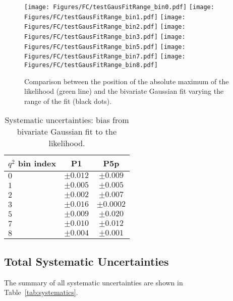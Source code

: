 \begin{figure}
  \centering
  \texttt{[image: Figures/FC/testGausFitRange\_bin0.pdf]}
  \texttt{[image: Figures/FC/testGausFitRange\_bin1.pdf]}
  \texttt{[image: Figures/FC/testGausFitRange\_bin2.pdf]}
  \texttt{[image: Figures/FC/testGausFitRange\_bin3.pdf]}
  \texttt{[image: Figures/FC/testGausFitRange\_bin5.pdf]}
  \texttt{[image: Figures/FC/testGausFitRange\_bin7.pdf]}
  \texttt{[image: Figures/FC/testGausFitRange\_bin8.pdf]}
  \caption{Comparison between the position of the absolute maximum of the
    likelihood (green line) and the bivariate Gaussian fit varying the range of the fit (black dots).
  }
  \label{fig:gausFitRange}
\end{figure}

\begin{table*}[!htb]
  \begin {center}
    \begin{small}
      \caption{Systematic uncertainties: bias from bivariate Gaussian fit to the likelihood.
        \label{tab:rangeGausFit}}
      \begin{tabular}{l|cc}
        \hline
        $q^2$ bin index   & P1 & P5p \\
        \hline
        $ 0 $    &   $\pm0.012$ & $\pm0.009 $   \\
        $ 1 $    &   $\pm0.005$ & $\pm0.005 $   \\
        $ 2 $    &   $\pm0.002$ & $\pm0.007 $   \\
        $ 3 $    &   $\pm0.016$ & $\pm0.0002$   \\
        $ 5 $    &   $\pm0.009$ & $\pm0.020 $   \\
        $ 7 $    &   $\pm0.010$ & $\pm0.012 $   \\
        $ 8 $    &   $\pm0.004$ & $\pm0.001 $   \\
        \hline
      \end{tabular}
    \end{small}
  \end{center}
\end{table*}

\clearpage
\subsection{Total Systematic Uncertainties}
\label{sec:sys-total}

The summary of all systematic uncertainties are shown in Table~\ref{tab:systematics}.

